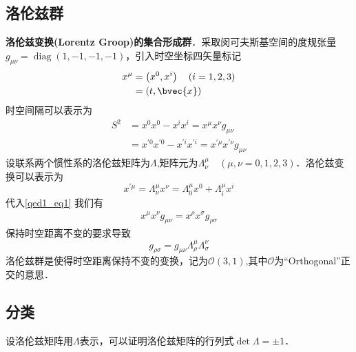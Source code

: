 \subsection{洛伦兹群}
\textbf{洛伦兹变换(Lorentz Groop)的集合形成群}．采取闵可夫斯基空间的度规张量$g_{\mu \nu}=\operatorname{diag}(1,-1,-1,-1)$，引入时空坐标四矢量标记
\begin{equation}
\begin{aligned}
x^{\mu} &=\left(x^{0}, x^{i}\right) \quad(i=1,2,3)\\
&=(t, \bvec{x})
\end{aligned}
\end{equation}
时空间隔可以表示为
\begin{equation}\label{qed1_eq1}\begin{aligned}
S^{2} &=x^{0} x^{0}-x^{i} x^{i}=x^{\mu} x^{\nu} g_{\mu \nu} \\
&=x^{\prime 0} x^{\prime 0}-x^{\prime i} x^{\prime i}=x^{\prime \mu} x^{\prime \nu} g_{\mu \nu}
\end{aligned}\end{equation}
设联系两个惯性系的洛伦兹矩阵为$\Lambda$,矩阵元为$\Lambda_{\nu}^{\mu}\quad(\mu,\nu=0,1,2,3)$．洛伦兹变换可以表示为
\begin{equation}\label{qed1_eq2}x^{\prime \mu}=\Lambda_{\nu}^{\mu} x^{\nu}=\Lambda_{0}^{\mu} x^{0}+\Lambda_{i}^{\mu} x^{i}\end{equation}
代入\autoref{qed1_eq1} 我们有
\begin{align}
x^{\mu} x^{\nu} g_{\mu \nu}=x^{\rho} x^{\sigma} g_{\rho \sigma}
\end{align}
保持时空距离不变的要求导致
\begin{equation}\label{qed1_eq3}g_{\rho \sigma}=g_{\mu \nu} \Lambda_{\rho}^{\mu} \Lambda_{\sigma}^{\nu}\end{equation}
洛伦兹群是使得时空距离保持不变的变换，记为$\mathcal{O}(3,1)$,其中$\mathcal{O}$为“Orthogonal”正交的意思．
\subsection{分类}
设洛伦兹矩阵用$\Lambda$表示，可以证明洛伦兹矩阵的行列式$\det \Lambda=\pm1$．

